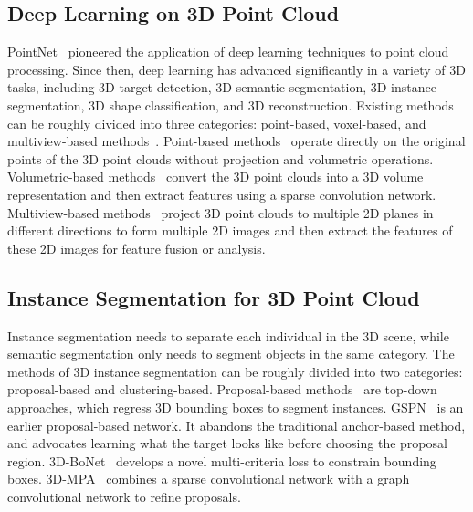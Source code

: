 \documentclass[10pt,twocolumn,letterpaper]{article}
\begin{document}
\subsection{Deep Learning on 3D Point Cloud}
PointNet~\cite{Qi_2017_CVPR} pioneered the application of deep learning techniques to point cloud processing.
Since then, deep learning has advanced significantly in a variety of 3D tasks, including 3D target detection, 3D semantic segmentation, 3D instance segmentation, 3D shape classification, and 3D reconstruction. Existing methods can be roughly divided into three categories: point-based, voxel-based, and multiview-based methods~\cite{guo2020deep}.
Point-based methods~\cite{qi2017pointnet++,wang2019dynamic,wu2019pointconv,rethage2018fully, wang2018sgpn} operate directly on the original points of the 3D point clouds without projection and volumetric operations.
Volumetric-based methods~\cite{maturana2015voxnet,riegler2017octnet} convert the 3D point clouds into a 3D volume representation and then extract features using a sparse convolution network.
Multiview-based methods~\cite{su2015multi,dai20183dmv,kundu2020virtual,hu-2021-bidirectional,jaderberg2015spatial} project 3D point clouds to multiple 2D planes in different directions to form multiple 2D images and then extract the features of these 2D images for feature fusion or analysis.

\subsection{Instance Segmentation for 3D Point Cloud}
Instance segmentation needs to separate each individual in the 3D scene, while semantic segmentation only needs to segment objects in the same category. The methods of 3D instance segmentation can be roughly divided into two categories: proposal-based and clustering-based. Proposal-based methods~\cite{hou20193d,qi2019deep,xie2020mlcvnet} are top-down approaches, which regress 3D bounding boxes to segment instances. GSPN~\cite{yi2019gspn} is an earlier proposal-based network. It abandons the traditional anchor-based method, and advocates learning what the target looks like before choosing the proposal region. 3D-BoNet~\cite{yang2019learning} develops a novel multi-criteria loss to constrain bounding boxes. 3D-MPA~\cite{engelmann20203d} combines a sparse convolutional network with a graph convolutional network to refine proposals.
\end{document}
